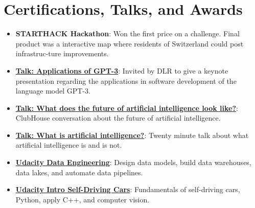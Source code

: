 \documentclass[letterpaper,11pt]{article}
\newcommand{\resumeItem}[2]{
  \item\small{
    \textbf{#1}{: #2 \vspace{-2pt}}
  }
}
\newcommand{\resumeSubItem}[2]{\resumeItem{#1}{#2}\vspace{-4pt}}
\newcommand{\resumeSubHeadingListStart}{\begin{itemize}[leftmargin=*]}
\newcommand{\resumeSubHeadingListEnd}{\end{itemize}}
\begin{document}
\section{Certifications, Talks, and Awards}
  \resumeSubHeadingListStart
    \resumeSubItem{STARTHACK Hackathon}
      {Won the first price on a challenge. Final product was a interactive map where residents of Switzerland could post infrastruc-ture improvements.}
    \resumeSubItem{\href{https://florianwoelki-dlr-slides.vercel.app/}{Talk: Applications of GPT-3}}
      {Invited by DLR to give a keynote presentation regarding the applications in software development of the language model GPT-3.}
    \resumeSubItem{\href{https://youtu.be/cZ--7TzyzfM}{Talk: What does the future of artificial intelligence look like?}}
      {ClubHouse conversation about the future of artificial intelligence.}
    \resumeSubItem{\href{https://youtu.be/m9kapfxwYOA}{Talk: What is artificial intelligence?}}
      {Twenty minute talk about what artificial intelligence is and is not.}
    \resumeSubItem{\href{https://github.com/FlorianWoelki/portfolio/blob/master/src/assets/certificates/data-engineering.pdf}{Udacity Data Engineering}}
      {Design data models, build data warehouses, data lakes, and automate data pipelines.}
    \resumeSubItem{\href{https://github.com/FlorianWoelki/portfolio/blob/master/src/assets/certificates/intro-self-driving-cars.pdf}{Udacity Intro Self-Driving Cars}}
      {Fundamentals of self-driving cars, Python, apply C++, and computer vision.}
  \resumeSubHeadingListEnd
\end{document}
